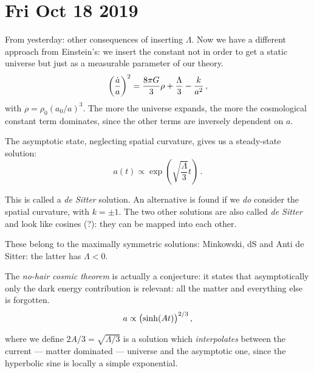 \documentclass[main.tex]{subfiles}
\begin{document}
\section*{Fri Oct 18 2019}

From yesterday: other consequences of inserting \(\Lambda \).
Now we have a different approach from Einstein's: we insert the constant not in order to get a static universe but just as a measurable parameter of our theory. 
%
\begin{equation}
  \qty(\frac{\dot{a} }{a})^2 = \frac{8 \pi G }{3} \rho +\frac{\Lambda}{3} - \frac{k}{a^2}
\,,
\end{equation}
%
with \(\rho = \rho_0 (a_0 / a)^3\). The more the universe expands, the more the cosmological constant term dominates, since the other terms are inversely dependent on \(a\).

The asymptotic state, neglecting spatial curvature, gives us a steady-state solution: 
%
\begin{equation}
  a(t) \propto \exp(\sqrt{\frac{\Lambda}{3}} t) 
\,.
\end{equation}

This is called a \emph{de Sitter} solution. An alternative is found if we \emph{do} consider the spatial curvature, with \(k = \pm 1\). The two other solutions are also called \emph{de Sitter} and look like cosines (?): they can be mapped into each other.


These belong to the maximally symmetric solutions: Minkowski, dS and Anti de Sitter: the latter has \(\Lambda < 0\).


The \emph{no-hair cosmic theorem} is actually a conjecture: it states that asymptotically only the dark energy contribution is relevant: all the matter and everything else is forgotten. 
%
\begin{equation}
  a \propto \qty(\sinh(At))^{2/3}
\,,
\end{equation}
%

where we define \(2A/3 = \sqrt{\Lambda /3} \) is a solution which \emph{interpolates} between the current --- matter dominated --- universe and the asymptotic one, since the hyperbolic sine is locally a simple exponential.
\end{document}
